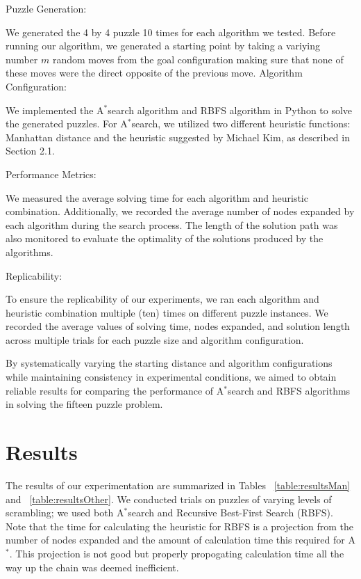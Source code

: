 \documentclass{article}
\begin{document}
{Puzzle Generation:}

We generated the 4 by 4 puzzle 10 times for each algorithm we tested. Before running our algorithm, we generated a starting point by taking a variying number $m$ random moves from the goal configuration making sure that none of these moves were the direct opposite of the previous move. 
Algorithm Configuration:

We implemented the A$^*$search algorithm and RBFS algorithm in Python to solve the generated puzzles.
For A$^*$search, we utilized two different heuristic functions: Manhattan distance and the heuristic suggested by Michael Kim, as described in Section 2.1.

Performance Metrics:

We measured the average solving time for each algorithm and heuristic combination.
Additionally, we recorded the average number of nodes expanded by each algorithm during the search process.
The length of the solution path was also monitored to evaluate the optimality of the solutions produced by the algorithms.

Replicability:

To ensure the replicability of our experiments, we ran each algorithm and heuristic combination multiple (ten) times on different puzzle instances.
We recorded the average values of solving time, nodes expanded, and solution length across multiple trials for each puzzle size and algorithm configuration.
 
By systematically varying the starting distance and algorithm configurations while maintaining consistency in experimental conditions, we aimed to obtain reliable results for comparing the performance of A$^*$search and RBFS algorithms in solving the fifteen puzzle problem.

\section{Results}
The results of our experimentation are summarized in Tables ~\ref{table:resultsMan} and ~\ref{table:resultsOther}. We conducted trials on puzzles of varying levels of scrambling; we used both A$^*$search and Recursive Best-First Search (RBFS). Note that the time for calculating the heuristic for RBFS is a projection from the number of nodes expanded and the amount of calculation time this required for A$^*$. This projection is not good but properly propogating calculation time all the way up the chain was deemed inefficient. 
\end{document}
